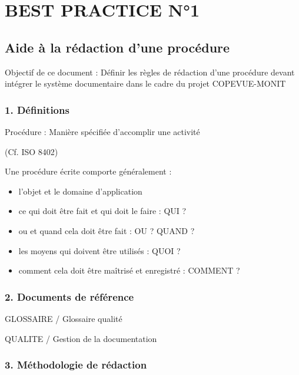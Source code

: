 \documentclass{article}
\title{}
\author{}
\date{}
\begin{document}
\section[BEST PRACTICE N°1]{BEST PRACTICE N°1}
\subsection[Aide à la rédaction d’une procédure]{Aide à la rédaction
d’une procédure}

\bigskip


\bigskip

Objectif de ce document : Définir les règles de rédaction d’une
procédure devant intégrer le système documentaire dans le cadre du
projet COPEVUE-MONIT


\bigskip

\subsubsection[1. Définitions]{1. Définitions}
Procédure : Manière spécifiée d’accomplir une activité

(Cf. ISO 8402)


\bigskip

Une procédure écrite comporte généralement :

\begin{itemize}
\item l’objet et  le domaine d’application
\item ce qui doit être fait et qui doit le faire : QUI ?
\item ou et quand cela doit être fait : OU ? QUAND ?
\item les moyens qui doivent être utilisés : QUOI ?
\item comment cela doit  être maîtrisé et  enregistré : COMMENT ?
\end{itemize}

\bigskip

\subsubsection[2. Documents de référence]{2. Documents de référence}

\bigskip

GLOSSAIRE / Glossaire qualité

QUALITE / Gestion de la documentation


\bigskip

\subsubsection[3. Méthodologie de rédaction]{3. Méthodologie de
rédaction}
\end{document}
